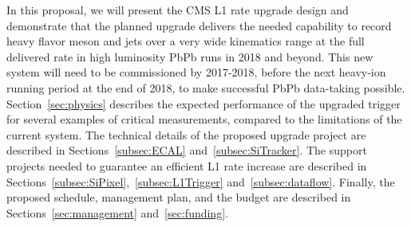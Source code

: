 In this proposal, we will present the CMS L1 rate upgrade design and demonstrate that the planned upgrade delivers the needed capability to record heavy flavor meson and jets over a very wide kinematics range at the full delivered rate in high luminosity PbPb runs in 2018 and beyond. This new system will need to be commissioned by 2017-2018, before the next heavy-ion running period at the end of 2018, to make successful PbPb data-taking possible. Section~\ref{sec:physics} describes the expected performance of the upgraded trigger for several examples of critical measurements, compared to the limitations of the current system. The technical details of the proposed upgrade project are described in Sections~\ref{subsec:ECAL} and~\ref{subsec:SiTracker}. The support projects needed to guarantee an efficient L1 rate increase are described in Sections~\ref{subsec:SiPixel},~\ref{subsec:L1Trigger} and~\ref{subsec:dataflow}. Finally, the proposed schedule, management plan, and the budget are described in Sections~\ref{sec:management} and~\ref{sec:funding}.

